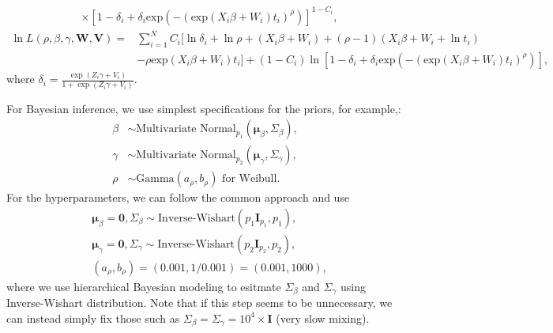 \documentclass[a4paper, 12pt]{article}
\newcommand {\dsum}{\displaystyle \sum}
\begin{document}
\begin{itemize}
\begin{equation}
\begin{aligned}
	&\times [1-\delta _{i}+\delta_i \mbox{exp}(-(\mbox{exp}(X_i{\beta}+W_i)t_i)^{\rho})]^{1-C_{i}},
	\end{aligned}
	\end{equation}
	\begin{equation}
	\begin{aligned}
	\ln L(\rho, {\beta}, {\gamma}, \mathbf{W}, \mathbf{V})=&\dsum\limits_{i=1}^{N}C_i [\ln\delta _{i}+ \ln\rho+(X_i{\beta}+ W_i) + (\rho-1)(X_i{\beta}+ W_i+ \ln t_i)\\&- \rho\mbox{exp}(X_i{\beta}+ W_i)t_i]+(1-C_i)\ln[1-\delta _{i}+\delta_i \mbox{exp}(-(\mbox{exp}(X_i{\beta}+W_i)t_i)^{\rho})],		
	\end{aligned}
	\end{equation}
	where $\delta_i =\frac{\exp ({Z}_i{\gamma} + V_i)}{1+\exp ({Z}_i{\gamma}+V_i)}$.
\end{itemize}
For Bayesian inference, we use simplest specifications for the priors, for example,:
\begin{equation}
\begin{aligned}
{\beta} &\sim \mbox{Multivariate Normal}_{p_1}(\mathbf{\mu}_{\beta}, \Sigma_{\beta}),\\
{\gamma} &\sim \mbox{Multivariate Normal}_{p_2}(\mathbf{\mu}_{\gamma}, \Sigma_{\gamma}),\\
\rho&\sim \mbox{Gamma}(a_{\rho}, b_{\rho}) \mbox{ for Weibull}.
\end{aligned}
\end{equation}
For the hyperparameters, we can follow the common approach and use
\begin{equation}
\begin{aligned}
&\mathbf{\mu}_{\beta} = \mathbf{0}, \Sigma_{\beta} \sim \mbox{Inverse-Wishart}(p_1\mathbf{I}_{p_1}, p_1),\\
& \mathbf{\mu}_{\gamma} = \mathbf{0}, \Sigma_{\gamma} \sim \mbox{Inverse-Wishart}(p_2\mathbf{I}_{p_2}, p_2), \\
& (a_{\rho}, b_{\rho}) = (0.001, 1/0.001)= (0.001, 1000),
\end{aligned}
\end{equation}
where we use hierarchical Bayesian modeling to esitmate $\Sigma_{\beta}$ and $\Sigma_{\gamma}$ using Inverse-Wishart distribution. Note that if this step seems to be unnecessary, we can instead simply fix those such as $\Sigma_{\beta} =\Sigma_{\gamma} = 10^4\times\mathbf{I}$ (very slow mixing). 
\end{document}
